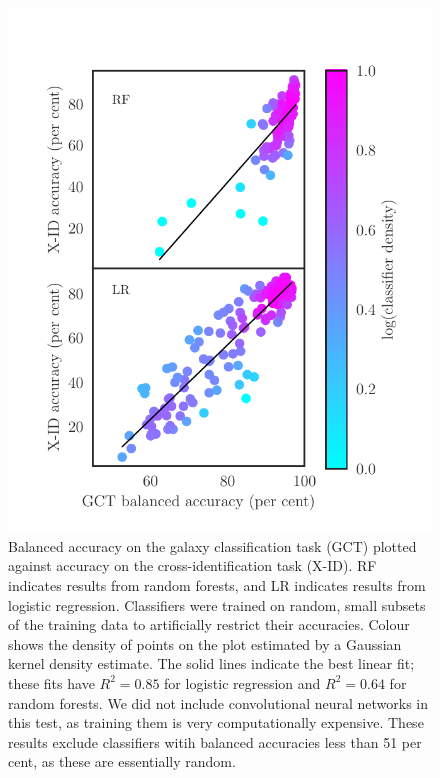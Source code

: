\documentclass[fleqn,usenatbib,usedcolumn]{mnras}
\begin{document}
    \begin{figure}
      \centering
      \includegraphics[width=\columnwidth]{images/gct-to-xid.pdf}
      \caption{Balanced accuracy on the galaxy classification task (GCT) plotted
      against accuracy on the cross-identification task (X-ID). RF indicates
      results from random forests, and LR indicates results from logistic
      regression. Classifiers were trained on random, small subsets of the
      training data to artificially restrict their accuracies. Colour shows
      the density of points on the plot estimated by a Gaussian kernel density
      estimate. The solid lines indicate the best linear fit; these fits have
      $R^2 = 0.85$ for logistic regression and $R^2 = 0.64$ for random
      forests. We did not include convolutional neural networks in this test,
      as training them is very computationally expensive. These results
      exclude classifiers witih balanced accuracies less than 51 per cent, as
      these are essentially random.
      \label{fig:gct-to-xid}}
    \end{figure}
\end{document}
